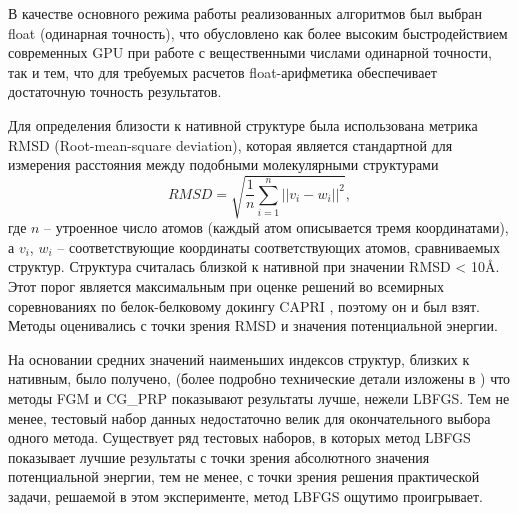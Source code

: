   В качестве основного режима работы реализованных алгоритмов был выбран float (одинарная точность), что обусловлено как более высоким быстродействием современных GPU при работе с вещественными числами одинарной точности, так и тем, что для требуемых расчетов float-арифметика обеспечивает достаточную точность результатов.

  Для определения близости к нативной структуре была использована метрика RMSD (Root-mean-square deviation), которая является стандартной для измерения расстояния между подобными молекулярными структурами 
  \[
  RMSD = \sqrt{\frac{1}{n}\sum_{i=1}^n ||v_i - w_i||^2},
  \]
  где $n$ -- утроенное число атомов (каждый атом описывается тремя координатами), а $v_i$, $w_i$ -- соответствующие координаты соответствующих атомов, сравниваемых структур.
  Структура считалась близкой к нативной при значении RMSD < 10Å. Этот порог является максимальным при оценке решений во всемирных соревнованиях по белок-белковому докингу CAPRI \cite{janin2002welcome}, поэтому он и был взят. Методы оценивались с точки зрения RMSD и значения потенциальной энергии.

  На основании средних значений наименьших индексов структур, близких к нативным, было получено, (более подробно технические детали изложены в \cite{yakovlev2019algorithms}) что методы FGM и CG\_PRP показывают результаты лучше, нежели LBFGS. Тем не менее, тестовый набор данных недостаточно велик для окончательного выбора одного метода. Существует ряд тестовых наборов, в которых метод LBFGS показывает лучшие результаты с точки зрения абсолютного значения потенциальной энергии, тем не менее, с точки зрения решения практической задачи, решаемой в этом эксперименте, метод LBFGS ощутимо проигрывает.

